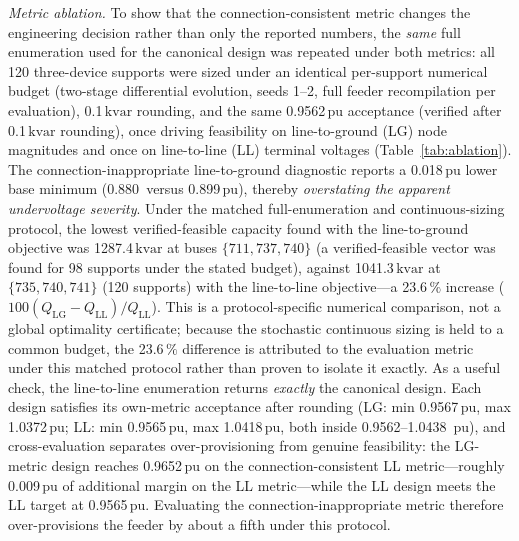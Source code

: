 \documentclass{ieeeaccess}
\providecommand{\percent}{\%}
\newcommand{\num}[1]{#1}
\newcommand{\SI}[2]{#1\,\ensuremath{\mathrm{#2}}}
\newcommand{\numrange}[2]{#1\mbox{--}#2}
\newcommand{\kvar}{\text{kvar}}
\begin{document}
\emph{Metric ablation.} To show that the connection-consistent metric changes the
engineering decision rather than only the reported numbers, the \emph{same} full
enumeration used for the canonical design was repeated under both metrics: all 120
three-device supports were sized under an identical per-support numerical budget
(two-stage differential evolution, seeds 1--2, full feeder recompilation per
evaluation), \SI{0.1}{\kvar} rounding, and the same
\SI{0.9562}{pu} acceptance (verified after \SI{0.1}{\kvar} rounding), once driving
feasibility on line-to-ground (LG) node magnitudes and once on line-to-line (LL)
terminal voltages (Table~\ref{tab:ablation}). The connection-inappropriate
line-to-ground diagnostic reports a \SI{0.018}{pu} lower base minimum
(\SI{0.880}{} versus \SI{0.899}{pu}), thereby \emph{overstating the apparent
undervoltage severity}. Under the matched full-enumeration and continuous-sizing
protocol, the lowest verified-feasible capacity found with the line-to-ground
objective was \SI{1287.4}{\kvar} at buses $\{711,737,740\}$
(a verified-feasible vector was found for \num{98} supports under the stated budget),
against \SI{1041.3}{\kvar}
at $\{735,740,741\}$ (\num{120} supports) with the line-to-line objective---a
\SI{23.6}{\percent} increase
($100(Q_{\mathrm{LG}}-Q_{\mathrm{LL}})/Q_{\mathrm{LL}}$). This is a
protocol-specific numerical comparison, not a global optimality certificate; because
the stochastic continuous sizing is held to a common budget, the \SI{23.6}{\percent}
difference is attributed to the evaluation metric under this matched protocol rather
than proven to isolate it exactly. As a useful check, the line-to-line enumeration
returns \emph{exactly} the canonical design. Each design satisfies its own-metric
acceptance after rounding (LG: min \SI{0.9567}{pu}, max \SI{1.0372}{pu}; LL: min
\SI{0.9565}{pu}, max \SI{1.0418}{pu}, both inside \numrange{0.9562}{1.0438}~pu),
and cross-evaluation separates over-provisioning from genuine feasibility: the
LG-metric design reaches \SI{0.9652}{pu} on the connection-consistent LL
metric---roughly \SI{0.009}{pu} of additional margin on the LL metric---while the LL
design meets the LL target at \SI{0.9565}{pu}. Evaluating the connection-inappropriate
metric therefore over-provisions the feeder by about a fifth under this protocol.
\end{document}
